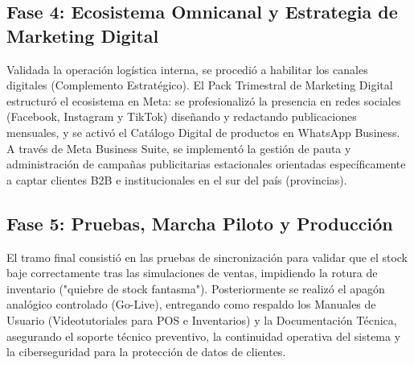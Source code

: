 \subsection{Fase 4: Ecosistema Omnicanal y Estrategia de Marketing Digital}
Validada la operación logística interna, se procedió a habilitar los canales digitales (Complemento Estratégico). El Pack Trimestral de Marketing Digital estructuró el ecosistema en Meta: se profesionalizó la presencia en redes sociales (Facebook, Instagram y TikTok) diseñando y redactando publicaciones mensuales, y se activó el Catálogo Digital de productos en WhatsApp Business. A través de Meta Business Suite, se implementó la gestión de pauta y administración de campañas publicitarias estacionales orientadas específicamente a captar clientes B2B e institucionales en el sur del país (provincias). 

\subsection{Fase 5: Pruebas, Marcha Piloto y Producción}
El tramo final consistió en las pruebas de sincronización para validar que el stock baje correctamente tras las simulaciones de ventas, impidiendo la rotura de inventario ("quiebre de stock fantasma"). Posteriormente se realizó el apagón analógico controlado (Go-Live), entregando como respaldo los Manuales de Usuario (Videotutoriales para POS e Inventarios) y la Documentación Técnica, asegurando el soporte técnico preventivo, la continuidad operativa del sistema y la ciberseguridad para la protección de datos de clientes.
